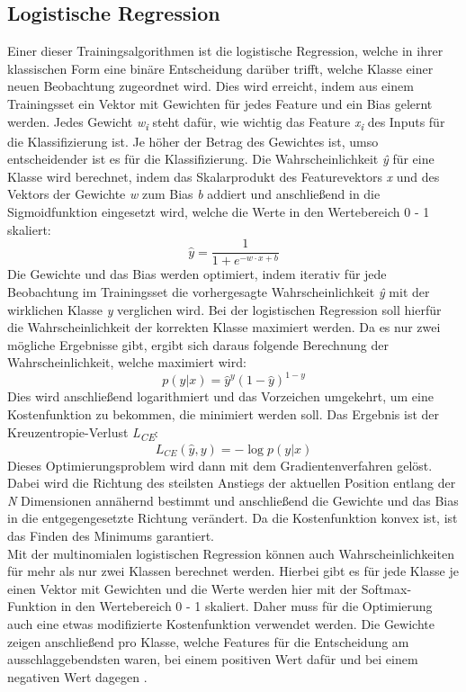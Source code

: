 \subsection{Logistische Regression}
Einer dieser Trainingsalgorithmen ist die logistische Regression, welche in ihrer klassischen Form eine binäre Entscheidung darüber trifft, welche Klasse einer neuen Beobachtung zugeordnet wird. Dies wird erreicht, indem aus einem Trainingsset ein Vektor mit Gewichten für jedes Feature und ein Bias gelernt werden. Jedes Gewicht \textit{w\textsubscript{i}} steht dafür, wie wichtig das Feature \textit{x\textsubscript{i}} des Inputs für die Klassifizierung ist. Je höher der Betrag des Gewichtes ist, umso entscheidender ist es für die Klassifizierung. Die Wahrscheinlichkeit \textit{\^{y}} für eine Klasse wird berechnet, indem das Skalarprodukt des Featurevektors \textit{x} und des Vektors der Gewichte \textit{w} zum Bias \textit{b} addiert und anschließend in die Sigmoidfunktion eingesetzt wird, welche die Werte in den Wertebereich 0 - 1 skaliert: 
\[ \hat{y} = \frac{1}{1 + e^{-w \cdot x + b}} \]
Die Gewichte und das Bias werden optimiert, indem iterativ für jede Beobachtung im Trainingsset die vorhergesagte Wahrscheinlichkeit \textit{\^{y}} mit der wirklichen Klasse \textit{y} verglichen wird. Bei der logistischen Regression soll hierfür die Wahrscheinlichkeit der korrekten Klasse maximiert werden. Da es nur zwei mögliche Ergebnisse gibt, ergibt sich daraus folgende Berechnung der Wahrscheinlichkeit, welche maximiert wird:
\[ p(y|x) = \hat{y}^y (1-\hat{y})^{1-y} \]
Dies wird anschließend logarithmiert und das Vorzeichen umgekehrt, um eine Kostenfunktion zu bekommen, die minimiert werden soll. Das Ergebnis ist der Kreuzentropie-Verlust \textit{L\textsubscript{CE}}:
\[ L_{CE}(\hat{y},y) = -\log{p(y|x)} \]
Dieses Optimierungsproblem wird dann mit dem Gradientenverfahren gelöst. Dabei wird die Richtung des steilsten Anstiegs der aktuellen Position entlang der \textit{N} Dimensionen annähernd bestimmt und anschließend die Gewichte und das Bias in die entgegengesetzte Richtung verändert. Da die Kostenfunktion konvex ist, ist das Finden des Minimums garantiert.\\
Mit der multinomialen logistischen Regression können auch Wahrscheinlichkeiten für mehr als nur zwei Klassen berechnet werden. Hierbei gibt es für jede Klasse je einen Vektor mit Gewichten und die Werte werden hier mit der Softmax-Funktion in den Wertebereich 0 - 1 skaliert. Daher muss für die Optimierung auch eine etwas modifizierte Kostenfunktion verwendet werden. Die Gewichte zeigen anschließend pro Klasse, welche Features für die Entscheidung am ausschlaggebendsten waren, bei einem positiven Wert dafür und bei einem negativen Wert dagegen \cite[K.~5]{jurafsky2014speech}.


